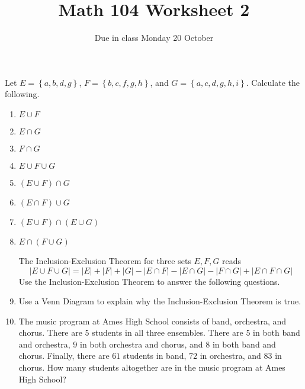 \documentclass[11pt]{article}
\author{}\date{Due in class Monday 20 October}
\title{Math 104 Worksheet 2}\author{}
\begin{document}
\maketitle
\pagestyle{empty}
Let $E=\left\{a,b,d,g\right\}$,
$F=\left\{b,c,f,g,h\right\}$, and
$G=\left\{a,c,d,g,h,i\right\}$.
Calculate the following.
\begin{enumerate}
\item $E\cup F$\vspace{.25in}
\item $E\cap G$\vspace{.25in}
\item $F\cap G$\vspace{.25in}
\item $E\cup F\cup G$\vspace{.25in}
\item $\left(E\cup F\right)\cap G$\vspace{.25in}
\item $\left(E\cap F\right)\cup G$\vspace{.25in}
\item $\left(E\cup F\right)\cap\left(E\cup G\right)$\vspace{.25in}
\item $E\cap\left(F\cup G\right)$\vspace{.25in}

The Inclusion-Exclusion Theorem for three sets $E,F,G$ reads
\[\left|E\cup F\cup G\right|
=\left|E\right|+\left|F\right|+\left|G\right|
-\left|E\cap F\right|
-\left|E\cap G\right|
-\left|F\cap G\right|
+\left|E\cap F\cap G\right|\]
Use the Inclusion-Exclusion Theorem to answer the following questions.
\item Use a Venn Diagram to explain why
the Inclusion-Exclusion Theorem is true.
\item The music program at Ames High School
consists of band, orchestra, and chorus. There are
$5$ students in all three ensembles.
There are $5$ in both band and orchestra, $9$
in both orchestra and chorus, and $8$ in both band
and chorus. Finally, there are $61$ students in band,
$72$ in orchestra, and $83$ in chorus. How many students
altogether are in the music program at Ames High School?
\end{enumerate}
\end{document}
